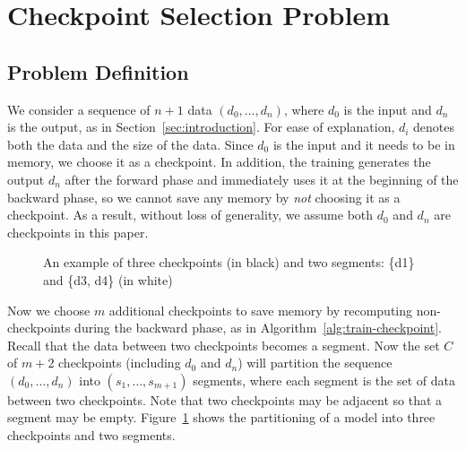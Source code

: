 \section{Checkpoint Selection Problem}\label{sec:partition}

\subsection{Problem Definition}

We consider a sequence of $n+1$ data $(d_0, \dots, d_n)$, where $d_0$ is the input and $d_n$ is the output, as in Section~\ref{sec:introduction}.
For ease of explanation, $d_i$ denotes both the data and the size of the data.
Since $d_0$ is the input and it needs to be in memory, we choose it as a checkpoint.
In addition, the training generates the output $d_n$ after the forward phase and immediately uses it at the beginning of the backward phase, so we cannot save any memory by {\em not} choosing it as a checkpoint.
As a result, without loss of generality, we assume both $d_0$ and $d_n$ are checkpoints in this paper.

\begin{figure}[h!tb]
\vspace*{5mm}
\begin{center}
\end{center}
\vspace*{-10mm}
\caption{An example of three checkpoints (in black) and two segments: \{d1\} and \{d3, d4\} (in white)} \label{fig:layers}
\end{figure}


Now we choose $m$ additional checkpoints to save memory by recomputing non-checkpoints during the backward phase, as in Algorithm~\ref{alg:train-checkpoint}.
Recall that the data between two checkpoints becomes a segment.
Now the set $C$ of $m + 2$ checkpoints (including $d_0$ and $d_n$)  will partition the sequence $(d_0, \dots, d_n)$ into $(s_1, \ldots, s_{m+1})$ segments, where each segment is the set of data between two checkpoints.
Note that two checkpoints may be adjacent so that a segment may be empty.
Figure~\ref{fig:layers} shows the partitioning of a model into three checkpoints and two segments.

